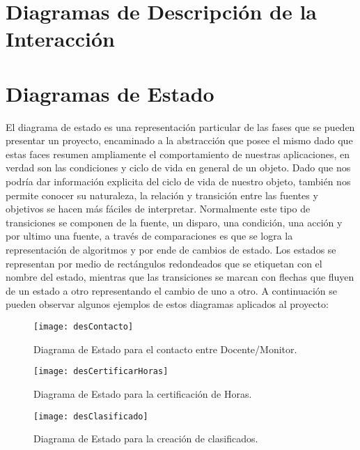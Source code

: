 \newpage

\section{Diagramas de Descripción de la Interacción}

\newpage

\section{Diagramas de Estado}
El diagrama de estado es una representación particular de las fases que se pueden presentar un proyecto, encaminado a la abstracción que posee el mismo dado que estas faces resumen ampliamente el comportamiento de nuestras aplicaciones, en verdad son las condiciones y ciclo de vida en general de un objeto. 
Dado que nos podría dar información explicita del ciclo de vida de nuestro objeto, también nos permite conocer su naturaleza, la relación y transición entre las fuentes y objetivos se hacen más fáciles de interpretar.
Normalmente este tipo de transiciones se componen de la fuente, un disparo, una condición, una acción y por ultimo una fuente, a través de comparaciones es que se logra la representación de algoritmos y por ende de cambios de estado.  
Los estados se representan por medio de rectángulos redondeados que se etiquetan con el nombre del estado, mientras que las transiciones se marcan con flechas que fluyen de un estado a otro representando el cambio de uno a otro. A continuación se pueden observar algunos ejemplos de estos diagramas aplicados al proyecto:
\begin{figure}[H]
	\centering
	\texttt{[image: desContacto]}
	\centering
	\caption{Diagrama de Estado para el contacto entre Docente/Monitor.}
	\label{fig:desContacto}
\end{figure}

\begin{figure}[H]
	\centering
	\texttt{[image: desCertificarHoras]}
	\centering
	\caption{Diagrama de Estado para la certificación de Horas.}
	\label{fig:desCertificarHoras}
\end{figure}

\begin{figure}[H]
	\centering
	\texttt{[image: desClasificado]}
	\centering
	\caption{Diagrama de Estado para la creación de clasificados.}
	\label{fig:desClasificados}
\end{figure}